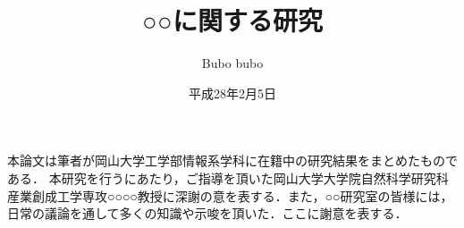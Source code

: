 \documentclass[11pt]{jreport}
\title{○○に関する研究}
\author{Bubo bubo}
\date{平成28年2月5日} %
\theoremstyle{mythmstyle}
\begin{document}
\maketitle


%
%






\acknowledgment
本論文は筆者が岡山大学工学部情報系学科に在籍中の研究結果をまとめたものである．
本研究を行うにあたり，ご指導を頂いた岡山大学大学院自然科学研究科
産業創成工学専攻○○○○教授に深謝の意を表する．また，○○研究室の皆様には，
日常の議論を通して多くの知識や示唆を頂いた．ここに謝意を表する．

\appendix

\printbibliography[title=参考文献]
\end{document}
